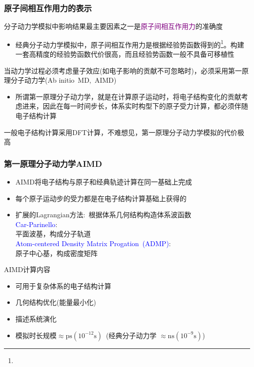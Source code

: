 {\frame
{
	\frametitle{原子间相互作用力的表示}
	分子动力学模拟中影响结果最主要因素之一是\textcolor{purple}{原子间相互作用力}的准确度
\vskip 5pt
\begin{itemize}
	\item 经典分子动力学模拟中，原子间相互作用力是根据经验势函数得到的\footnote{\fontsize{6.2pt}{4.2pt}\selectfont{经验势函数也称为力场，是参数化形式给出的原子间相互作用，一般通过对实验数据拟合或小体系的第一原理计算得到}}。构建一套高精度的经验势函数代价很高，而且经验势函数一般不具备可移植性
\end{itemize}
\vskip 5pt
	当动力学过程必须考虑量子效应(如电子影响的贡献不可忽略时)，必须采用第一原理分子动力学\textrm{(Ab initio~MD,~AIMD)}
	\begin{itemize}
		\item 所谓第一原理分子动力学，就是在计算原子运动时，将电子结构变化的贡献考虑进来，因此在每一时间步长，体系实时构型下的原子受力计算，都必须伴随电子结构计算
	\end{itemize}
	一般电子结构计算采用\textrm{DFT}计算，不难想见，第一原理分子动力学模拟的代价极高
}

\frame
{
	\frametitle{第一原理分子动力学\textrm{AIMD}}
	\begin{itemize}
		\item \textrm{AIMD}将电子结构与原子和经典轨迹计算在同一基础上完成
		\item 每个原子运动步的受力都是在电子结构计算基础上获得的
		\item 扩展的\textrm{Lagrangian}方法:~根据体系几何结构构造体系波函数\\
			\textcolor{blue}{\textrm{Car-Parinello}}:\\
			平面波基，构成分子轨道\\
			\textcolor{blue}{\textrm{Atom-centered Density Matrix Progation~(ADMP)}}:\\
			原子中心基，构成密度矩阵
	\end{itemize}
	\textrm{AIMD}计算内容
	\begin{itemize}
		\item 可用于复杂体系的电子结构计算
		\item 几何结构优化(能量最小化)
		\item 描述系统演化
		\item 模拟时长规模$\approx{\mathrm{ps}}(10^{-12}\mathrm{s})$~(经典分子动力学 $\approx\mathrm{ns}(10^{-9}\mathrm{s})$)
	\end{itemize}
}


}
